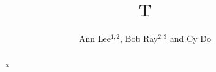 \documentclass[aps,prb,superscriptaddress]{revtex4-2}
\begin{document}
\title{T}
\author{Ann Lee$^{1,2}$, Bob Ray$^{2,3}$ and Cy Do}
\begin{abstract}x\end{abstract}
\maketitle
\end{document}
